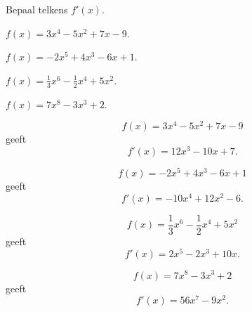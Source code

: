 \documentclass{ximera}
\begin{document}
\begin{oefening}{\oefB\ESS}

Bepaal telkens $f'(x)$.

\begin{question}

\(
f(x)=3x^4-5x^2+7x-9.
\)

\end{question}

\begin{question}

\(
f(x)=-2x^5+4x^3-6x+1.
\)

\end{question}

\begin{question}

\(
f(x)=\frac13x^6-\frac12x^4+5x^2.
\)

\end{question}

\begin{question}

\(
f(x)=7x^8-3x^3+2.
\)

\end{question}

\begin{oplossing}

\[
f(x)=3x^4-5x^2+7x-9
\]
geeft
\[
\boxed{f'(x)=12x^3-10x+7}.
\]

\[
f(x)=-2x^5+4x^3-6x+1
\]
geeft
\[
\boxed{f'(x)=-10x^4+12x^2-6}.
\]

\[
f(x)=\frac13x^6-\frac12x^4+5x^2
\]
geeft
\[
\boxed{f'(x)=2x^5-2x^3+10x}.
\]

\[
f(x)=7x^8-3x^3+2
\]
geeft
\[
\boxed{f'(x)=56x^7-9x^2}.
\]

\end{oplossing}

\end{oefening}


\end{document}
